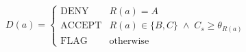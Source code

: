 \documentclass[border=1pt]{standalone}
\begin{document}
$\displaystyle
D(a) =
\begin{cases}
\text{DENY} & R(a) = A\\[2pt]
\text{ACCEPT} & R(a) \in \{B,C\} \;\wedge\; C_s \ge \theta_{R(a)}\\[2pt]
\text{FLAG} & \text{otherwise}
\end{cases}
$
\end{document}
